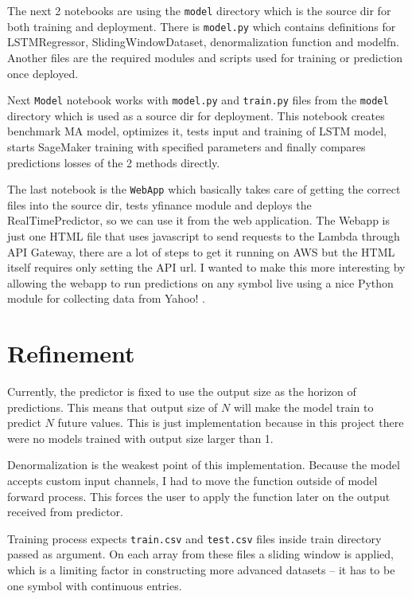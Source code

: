 \documentclass[a4paper,12pt]{article}
\begin{document}
The next 2 notebooks are using the \texttt{model} directory which is the source dir for both training and deployment. There is \texttt{model.py} which contains definitions for LSTMRegressor, SlidingWindowDataset, denormalization function and model\textunderscore fn. Another files are the required modules and scripts used for training or prediction once deployed.

Next \texttt{Model} notebook works with \texttt{model.py} and \texttt{train.py} files from the \texttt{model} directory which is used as a source dir for deployment. This notebook creates benchmark MA model, optimizes it, tests input and training of LSTM model, starts SageMaker training with specified parameters and finally compares predictions losses of the 2 methods directly.

The last notebook is the \texttt{WebApp} which basically takes care of getting the correct files into the source dir, tests yfinance module and deploys the RealTimePredictor, so we can use it from the web application.
The Webapp is just one HTML file that uses javascript to send requests to the Lambda through API Gateway, there are a lot of steps to get it running on AWS but the HTML itself requires only setting the API url. I wanted to make this more interesting by allowing the webapp to run predictions on any symbol live using a nice Python module for collecting data from Yahoo! \cite{yf}.

\section{Refinement}
Currently, the predictor is fixed to use the output size as the horizon of predictions. This means that output size of $N$ will make the model train to predict $N$ future values. This is just implementation because in this project there were no models trained with output size larger than 1.

Denormalization is the weakest point of this implementation. Because the model accepts custom input channels, I had to move the function outside of model forward process. This forces the user to apply the function later on the output received from predictor.

Training process expects \texttt{train.csv} and \texttt{test.csv} files inside train directory passed as argument.
On each array from these files a sliding window is applied, which is a limiting factor in constructing more advanced datasets -- it has to be one symbol with continuous entries.
\end{document}
